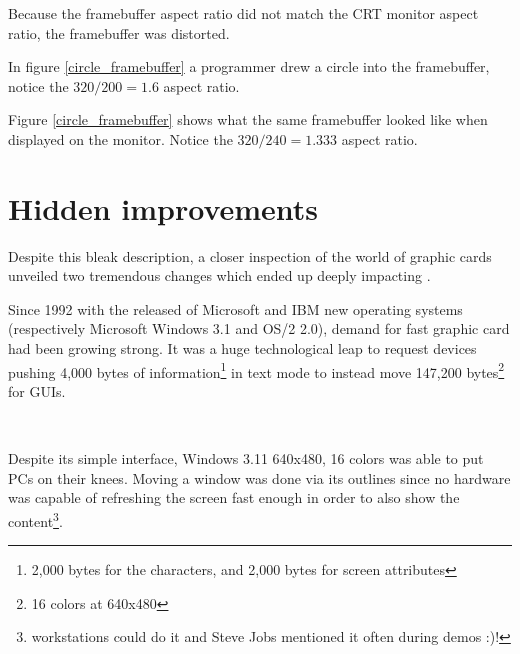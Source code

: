  \label{vga_ratio}
\par
\vspace{-2mm}
Because the framebuffer aspect ratio did not match the CRT monitor aspect ratio, the framebuffer was distorted.\\
\par
{}
\par
In figure \ref{circle_framebuffer} a programmer drew a circle into the framebuffer, notice the $ 320/200 = 1.6 $ aspect ratio.\\
\par
{}
\par
Figure \ref{circle_framebuffer} shows what the same framebuffer looked like when displayed on the monitor. Notice the $ 320/240 = 1.333 $ aspect ratio.\\







\section{Hidden improvements}
Despite this bleak description, a closer inspection of the world of graphic cards unveiled two tremendous changes which ended up deeply impacting \doom. \\
\par
Since 1992 with the released of Microsoft and IBM new operating systems (respectively Microsoft Windows 3.1 and OS/2 2.0), demand for fast graphic card had been growing strong. It was a huge technological leap to request devices pushing 4,000 bytes of information\footnote{2,000 bytes for the characters, and 2,000 bytes for screen attributes} in text mode to instead move 147,200 bytes\footnote{16 colors at 640x480} for GUIs.

\\
\par 
Despite its simple interface, Windows 3.11 640x480, 16 colors was able to put PCs on their knees. Moving a window was done via its outlines since no hardware was capable of refreshing the screen fast enough in order to also show the content\footnote{\NeXT workstations could do it and Steve Jobs mentioned it often during demos :)!}.



